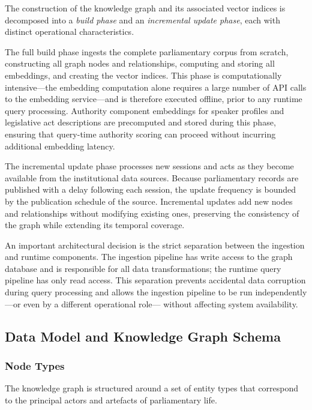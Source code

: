 The construction of the knowledge graph and its associated vector indices is decomposed
into a \textit{build phase} and an \textit{incremental update phase}, each with distinct
operational characteristics.

The full build phase ingests the complete parliamentary corpus from scratch, constructing
all graph nodes and relationships, computing and storing all embeddings, and creating the
vector indices. This phase is computationally intensive---the embedding computation alone
requires a large number of API calls to the embedding service---and is therefore executed
offline, prior to any runtime query processing. Authority component embeddings for
speaker profiles and legislative act descriptions are precomputed and stored during this
phase, ensuring that query-time authority scoring can proceed without incurring additional
embedding latency.

The incremental update phase processes new sessions and acts as they become available from
the institutional data sources. Because parliamentary records are published with a delay
following each session, the update frequency is bounded by the publication schedule of the
source. Incremental updates add new nodes and relationships without modifying existing
ones, preserving the consistency of the graph while extending its temporal coverage.

An important architectural decision is the strict separation between the ingestion and
runtime components. The ingestion pipeline has write access to the graph database and is
responsible for all data transformations; the runtime query pipeline has only read access.
This separation prevents accidental data corruption during query processing and allows the
ingestion pipeline to be run independently---or even by a different operational role---
without affecting system availability.


\subsection{Data Model and Knowledge Graph Schema}
\label{sec:data-model}

\subsubsection{Node Types}

The knowledge graph is structured around a set of entity types that correspond to the
principal actors and artefacts of parliamentary life.

